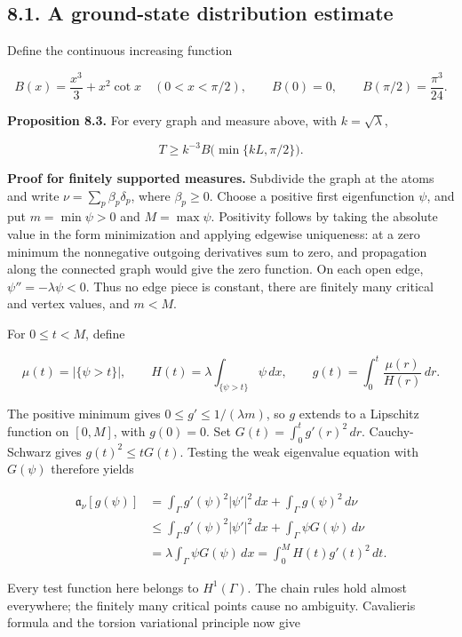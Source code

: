 \documentclass[11pt]{article}
\begin{document}
\subsection{8.1. A ground-state distribution
estimate}\label{a-ground-state-distribution-estimate}

Define the continuous increasing function

\[
B(x)=\frac{x^3}{3}+x^2\cot x\quad(0<x<\pi/2),
\qquad B(0)=0,\qquad B(\pi/2)=\frac{\pi^3}{24}.
\tag{73}
\]

\textbf{Proposition 8.3.} For every graph and measure above, with
\(k=\sqrt\lambda\),

\[
T\ge k^{-3}B\bigl(\min\{kL,\pi/2\}\bigr).
\tag{74}
\]

\textbf{Proof for finitely supported measures.} Subdivide the graph at
the atoms and write \(\nu=\sum_p\beta_p\delta_p\), where
\(\beta_p\ge0\). Choose a positive first eigenfunction \(\psi\), and put
\(m=\min\psi>0\) and \(M=\max\psi\). Positivity follows by taking the
absolute value in the form minimization and applying edgewise
uniqueness: at a zero minimum the nonnegative outgoing derivatives sum
to zero, and propagation along the connected graph would give the zero
function. On each open edge, \(\psi''=-\lambda\psi<0\). Thus no edge
piece is constant, there are finitely many critical and vertex values,
and \(m<M\).

For \(0\le t<M\), define

\[
\mu(t)=|\{\psi>t\}|,\qquad
H(t)=\lambda\int_{\{\psi>t\}}\psi\,dx,
\qquad g(t)=\int_0^t\frac{\mu(r)}{H(r)}\,dr.
\tag{75}
\]

The positive minimum gives \(0\le g'\le1/(\lambda m)\), so \(g\) extends
to a Lipschitz function on \([0,M]\), with \(g(0)=0\). Set
\(G(t)=\int_0^t g'(r)^2\,dr\). Cauchy-Schwarz gives \(g(t)^2\le tG(t)\).
Testing the weak eigenvalue equation with \(G(\psi)\) therefore yields

\[
\begin{aligned}
\mathfrak a_\nu[g(\psi)]
&=\int_\Gamma g'(\psi)^2|\psi'|^2\,dx
  +\int_\Gamma g(\psi)^2\,d\nu\\
&\le\int_\Gamma g'(\psi)^2|\psi'|^2\,dx
  +\int_\Gamma\psi G(\psi)\,d\nu\\
&=\lambda\int_\Gamma\psi G(\psi)\,dx
 =\int_0^M H(t)g'(t)^2\,dt.
\end{aligned}
\tag{76}
\]

Every test function here belongs to \(H^1(\Gamma)\). The chain rules
hold almost everywhere; the finitely many critical points cause no
ambiguity. Cavalieri\textquotesingle s formula and the torsion
variational principle now give
\end{document}
